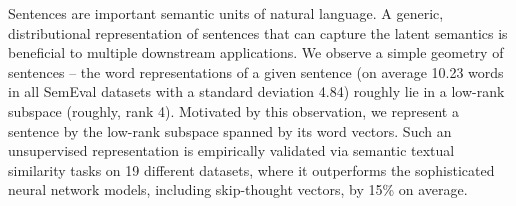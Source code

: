 Sentences are important semantic units of natural language. A generic, distributional representation of sentences that can capture the latent semantics is beneficial to multiple downstream applications. We observe a simple geometry of sentences -- the word representations of a given sentence (on average 10.23 words in all SemEval datasets with a standard deviation 4.84) roughly lie in a low-rank subspace (roughly, rank 4). Motivated by this observation, we represent a sentence by the low-rank subspace spanned by its word vectors. Such an unsupervised representation is empirically validated via semantic textual similarity tasks on 19 different datasets, where it outperforms the sophisticated neural network models,  including skip-thought vectors, by 15\% on average.
